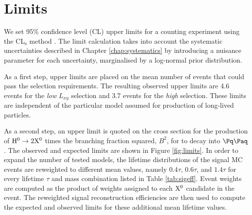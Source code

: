 \section{Limits}
\label{sec:limits}

We set 95\% confidence level
(CL) upper limits for a counting experiment
using the CL$_\mathrm{s}$ method \cite{Read:2002hq, Junk:1999kv}. The limit calculation
takes into account the systematic uncertainties described in Chapter 
\ref{chap:systematics} by introducing
a nuisance parameter for each uncertainty, marginalised by a log-normal prior distribution.

As a first step, upper limits are placed on the mean number of events that could pass
the selection requirements. The resulting observed upper limits are 4.6 events
for the {\it low} $L_{xy}$ selection and 3.7 events for the {\it high} selection.
 These limits are independent
of the particular model assumed for production of long-lived particles.

As a second step, an upper limit is quoted on the cross section
for the production of $\mathrm{H}^{0} \to 2\mathrm{X^{0}}$ times the branching fraction squared, $B^2$, for \X to decay into $\qq$.
The observed and
expected limits are shown in Figure \ref{fig:limits}. In order to expand the number of tested models,
the lifetime distributions of the signal MC events are reweighted to
different mean values, namely $0.4\tau$, $0.6\tau$, and $1.4\tau$ for every
lifetime $\tau$ and mass combination listed
in Table \ref{tab:sigeff}.
Event weights are computed as the product
 of weights assigned to each $\mathrm{X^{0}}$ candidate in the event.
The reweighted signal reconstruction efficiencies are then used
to compute the expected and observed limits for these additional mean lifetime values.

